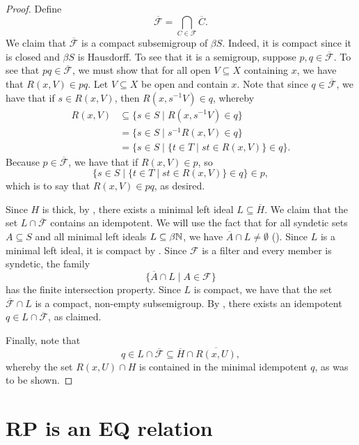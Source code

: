 \begin{proof}
    Define
    \[\overline{\mathscr{F}} = \bigcap_{C \in \mathscr{F}} \overline{C}.\]
    We claim that $\overline{\mathscr{F}}$ is a compact subsemigroup of $\beta S$. Indeed, it is compact since it is closed and $\beta S$ is Hausdorff.  To see that it is a semigroup, suppose $p, q \in \overline{\mathscr{F}}$. To see that $pq \in \overline{\mathscr{F}}$, we must show that for all open $V \subseteq X$ containing $x$, we have that $R(x, V) \in pq$.  Let $V \subseteq X$ be open and contain $x$.
    Note that since $q \in \overline{\mathscr{F}}$, we have that if $s \in R(x,V)$, then $R(x,s^{-1}V) \in q$, whereby
    \begin{align*}
        R(x,V) &\subseteq \big\{ s \in S \mid R(x,s^{-1}V) \in q \} \\
        &= \big\{ s \in S \mid s^{-1}R(x,V) \in q \}\\
        &= \big\{ s \in S \mid \{ t \in T \mid st \in R(x,V) \} \in q \}.
    \end{align*}
    Because $p \in \overline{\mathscr{F}}$, we have that if $R(x,V) \in p$, so
    \[\big\{ s \in S \mid \{ t \in T \mid st \in R(x,V) \} \in q \} \in p,\]
    which is to say that $R(x, V) \in pq$, as desired.

    Since $H$ is thick, by \cite[Thm. 4.48]{hindman_strauss_book_2012}, there exists a minimal left ideal $L \subseteq \overline{H}$.
    We claim that the set $L \cap \overline{\mathscr{F}}$ contains an idempotent.
    We will use the fact that for all syndetic sets $A \subseteq S$ and all minimal left ideals $L \subseteq \beta \mathbb{N}$, we have $\overline{A} \cap L \neq \emptyset$ (\cite[Thm. 4.48]{hindman_strauss_book_2012}).  Since $L$ is a minimal left ideal, it is compact by \cite[Thm. 2.6]{hindman_strauss_book_2012}.  Since $\mathscr{F}$ is a filter and every member is syndetic, the family
    \[\big\{\overline{A} \cap L  \mid  A \in \mathscr{F} \big\}\]
    has the finite intersection property.  Since $L$ is compact, we have that the set $\overline{\mathscr{F}} \cap L$ is a compact, non-empty subsemigroup. By \cite[Thm. 2.5]{hindman_strauss_book_2012}, there exists an idempotent $q \in L \cap \overline{\mathscr{F}}$, as claimed.

    Finally, note that
    \[q \in L \cap \overline{\mathscr{F}} \subseteq \overline{H} \cap \overline{R(x,U)},\]
    whereby the set $R(x,U) \cap H$ is contained in the minimal idempotent $q$, as was to be shown.
\end{proof}


\section{RP is an EQ relation}
\label{sec_RP}

